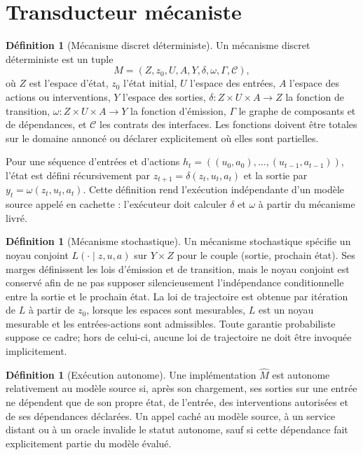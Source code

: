 \documentclass[11pt,oneside]{book}
\theoremstyle{definition}
\newtheorem{definition}[theoreme]{Définition}
\theoremstyle{remark}
\newcommand{\1}{\mathbf 1}
\begin{document}
\section{Transducteur mécaniste}
\begin{definition}[Mécanisme discret déterministe]
Un mécanisme discret déterministe est un tuple
\[
M=(Z,z_0,U,A,Y,\delta,\omega,\Gamma,\mathcal C),
\]
où $Z$ est l'espace d'état, $z_0$ l'état initial, $U$ l'espace des entrées, $A$ l'espace des actions ou interventions, $Y$ l'espace des sorties, $\delta:Z\times U\times A\to Z$ la fonction de transition, $\omega:Z\times U\times A\to Y$ la fonction d'émission, $\Gamma$ le graphe de composants et de dépendances, et $\mathcal C$ les contrats des interfaces. Les fonctions doivent être totales sur le domaine annoncé ou déclarer explicitement où elles sont partielles.
\end{definition}

Pour une séquence d'entrées et d'actions $h_t=((u_0,a_0),\ldots,(u_{t-1},a_{t-1}))$, l'état est défini récursivement par $z_{t+1}=\delta(z_t,u_t,a_t)$ et la sortie par $y_t=\omega(z_t,u_t,a_t)$. Cette définition rend l'exécution indépendante d'un modèle source appelé en cachette : l'exécuteur doit calculer $\delta$ et $\omega$ à partir du mécanisme livré.

\begin{definition}[Mécanisme stochastique]
Un mécanisme stochastique spécifie un noyau conjoint $L(\cdot\mid z,u,a)$ sur $Y\times Z$ pour le couple (sortie, prochain état). Ses marges définissent les lois d'émission et de transition, mais le noyau conjoint est conservé afin de ne pas supposer silencieusement l'indépendance conditionnelle entre la sortie et le prochain état. La loi de trajectoire est obtenue par itération de $L$ à partir de $z_0$, lorsque les espaces sont mesurables, $L$ est un noyau mesurable et les entrées-actions sont admissibles. Toute garantie probabiliste suppose ce cadre; hors de celui-ci, aucune loi de trajectoire ne doit être invoquée implicitement.
\end{definition}

\begin{definition}[Exécution autonome]
Une implémentation $\widehat M$ est autonome relativement au modèle source si, après son chargement, ses sorties sur une entrée ne dépendent que de son propre état, de l'entrée, des interventions autorisées et de ses dépendances déclarées. Un appel caché au modèle source, à un service distant ou à un oracle invalide le statut autonome, sauf si cette dépendance fait explicitement partie du modèle évalué.
\end{definition}
\end{document}
